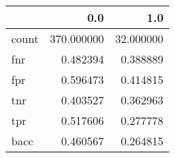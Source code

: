 \begin{tabular}{lrr}
\toprule
{} &         0.0 &        1.0 \\
\midrule
count &  370.000000 &  32.000000 \\
fnr   &    0.482394 &   0.388889 \\
fpr   &    0.596473 &   0.414815 \\
tnr   &    0.403527 &   0.362963 \\
tpr   &    0.517606 &   0.277778 \\
bacc  &    0.460567 &   0.264815 \\
\bottomrule
\end{tabular}
